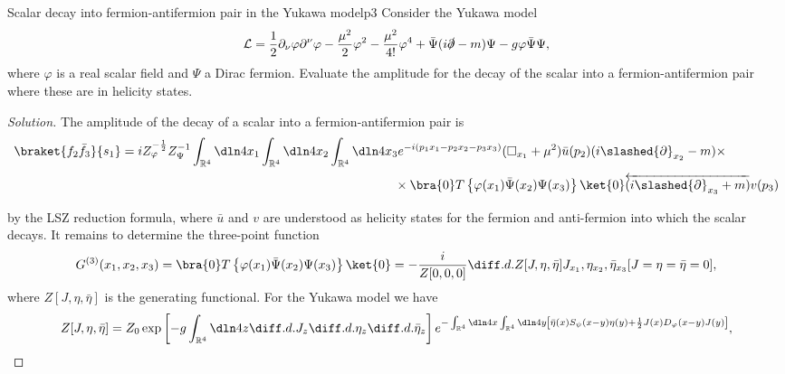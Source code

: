 \begin{problem}{Scalar decay into fermion-antifermion pair in the Yukawa model}{p3}
   Consider the Yukawa model
   \begin{equation*}
      \mathcal{L} = \frac12 \partial_\nu \varphi \partial^\nu \varphi - \frac{\mu^2}{2} \varphi^2 - \frac{\mu^2}{4!} \varphi^4 + \bar{\Psi} (i \slashed{\partial} - m) \Psi - g \varphi \bar{\Psi} \Psi,
   \end{equation*}
   where \(\varphi\) is a real scalar field and \(\Psi\) a Dirac fermion. Evaluate the amplitude for the decay of the scalar into a fermion-antifermion pair where these are in helicity states.
\end{problem}
\begin{proof}[Solution]
   The amplitude of the decay of a scalar into a fermion-antifermion pair is
   \begin{align*}
      \braket{f_2 \bar{f}_3}{s_1} &= iZ_\varphi^{-\frac12} Z_\Psi^{-1} \int_{\mathbb{R}^4} \dln4{x_1} \int_{\mathbb{R}^4} \dln4{x_2} \int_{\mathbb{R}^4} \dln4{x_3} e^{-i(p_1 x_1 - p_2 x_2 - p_3 x_3)} (\square_{x_1} + \mu^2) \bar{u}(p_2) (i \slashed{\partial}_{x_2} - m) \times\\
                                  &{}\phantom{= iZ_\varphi^{-\frac12} Z_\psi^{-1}\int_{\mathbb{R}^4} \dln4{x_1}\int_{\mathbb{R}^4} \dln4{x_2}\int_{\mathbb{R}^4} \dln4{x_3}} \times \bra{0} T\left\{\varphi(x_1) \bar{\Psi}(x_2) \Psi(x_3)\right\}\ket{0} \overleftarrow{(i \slashed{\partial}_{x_3} + m)} v(p_3)
   \end{align*}
   by the LSZ reduction formula, where \(\bar{u}\) and \(v\) are understood as helicity states for the fermion and anti-fermion into which the scalar decays. It remains to determine the three-point function
   \begin{equation*}
      G^{(3)}(x_1, x_2, x_3) = \bra{0} T\left\{\varphi(x_1) \bar{\Psi}(x_2) \Psi(x_3)\right\}\ket{0} = -\frac{i}{Z[0,0,0]} \diff.d.{Z[J, \eta, \bar{\eta}]}{J_{x_1},\eta_{x_2},\bar{\eta}_{x_3}}[J = \eta = \bar{\eta} = 0],
   \end{equation*}
   where \(Z[J, \eta, \bar{\eta}]\) is the generating functional. For the Yukawa model we have
   \begin{equation*}
      Z[J,\eta,\bar{\eta}] = Z_0\exp\left[-g \int_{\mathbb{R}^4} \dln4z \diff.d.{}{J_z} \diff.d.{}{\eta_z} \diff.d.{}{\bar{\eta}_z}\right]e^{-\int_{\mathbb{R}^4} \dln4x \int_{\mathbb{R}^4} \dln4y \left[\bar{\eta}(x) S_\psi(x - y) \eta(y) + \frac12 J(x) D_\varphi(x - y) J(y)\right]},

\end{equation*}
\end{proof}
